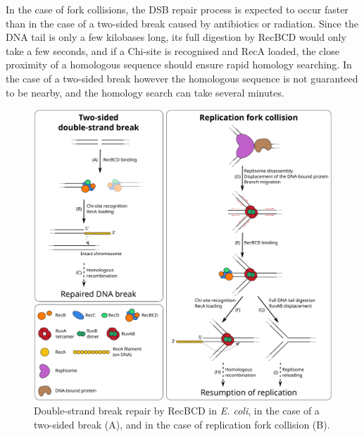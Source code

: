 In the case of fork collisions, the DSB repair process is expected to occur faster than in the case of a two-sided break caused by antibiotics or radiation. Since the DNA tail is only a few kilobases long, its full digestion by RecBCD would only take a few seconds, and if a Chi-site is recognised and RecA loaded, the close proximity of a homologous sequence should ensure rapid homology searching. In the case of a two-sided break however the homologous sequence is not guaranteed to be nearby, and the homology search can take several minutes.\cite{Wiktor2021}

\begin{figure}[htbp]
    \centering
    \includegraphics[width=.8\textwidth]{Figures/DSB_scheme.pdf}
    \caption{Double-strand break repair by RecBCD in \emph{E. coli}, in the case of a two-sided break (A), and in the case of replication fork collision (B).}
    \label{Fig:DSB_scheme}
\end{figure}


